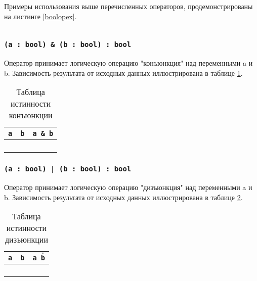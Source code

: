 Примеры использования выше перечисленных операторов, продемонстрированы на листинге \ref{boolopex}.

\begin{sourcecode}
	\label{boolopex}
	\inputminted[linenos]{icl}{../sources/boolopex.icL}
\end{sourcecode}

\subsubsection{\texttt{(a : bool) & (b : bool) : bool}}

Оператор принимает логическую операцию "конъюнкция" над переменными a и b. Зависимость результата от исходных данных иллюстрирована в таблице \ref{conjtable}.

\begin{table}[htb]
	\caption{Таблица истинности конъюнкции}
	\label{conjtable}
	\begin{tabular}{|c|c|c|}
		\hline
		\texttt{a} & \texttt{b} & \texttt{a \& b} \\ \hline
		\false{} & \false{} & \false{}  	\\ \hline
		\false{} & \true{}  & \false{}  	\\ \hline
		\true{}  & \false{} & \false{}  	\\ \hline
		\true{}  & \true{}  & \true{}   	\\ \hline
	\end{tabular}
	\vspace{-2em}
\end{table}

\subsubsection{\texttt{(a : bool) | (b : bool) : bool}}

Оператор принимает логическую операцию "дизъюнкция" над переменными a и b. Зависимость результата от исходных данных иллюстрирована в таблице \ref{distable}.

\begin{table}[htb]
	\caption{Таблица истинности дизъюнкции}
	\label{distable}
	\begin{tabular}{|c|c|c|}
		\hline
		\texttt{a} & \texttt{b} & \texttt{a \| b} 	\\ \hline
		\false{} & \false{} & \false{} 		\\ \hline
		\false{} & \true{}  & \true{}  		\\ \hline
		\true{}  & \false{} & \true{}  		\\ \hline
		\true{}  & \true{}  & \true{}  		\\ \hline
	\end{tabular}
	\vspace{-2em}
\end{table}

